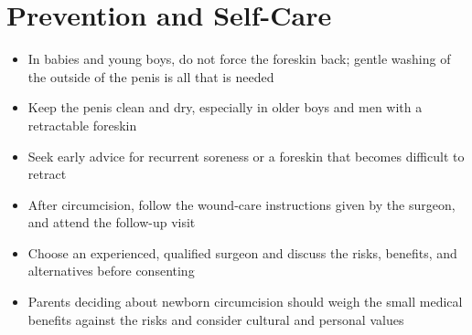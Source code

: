 \section*{Prevention and Self-Care}
\begin{itemize}
    \item In babies and young boys, do not force the foreskin back; gentle washing of the outside of the penis is all that is needed
    \item Keep the penis clean and dry, especially in older boys and men with a retractable foreskin
    \item Seek early advice for recurrent soreness or a foreskin that becomes difficult to retract
    \item After circumcision, follow the wound-care instructions given by the surgeon, and attend the follow-up visit
    \item Choose an experienced, qualified surgeon and discuss the risks, benefits, and alternatives before consenting
    \item Parents deciding about newborn circumcision should weigh the small medical benefits against the risks and consider cultural and personal values
\end{itemize}
